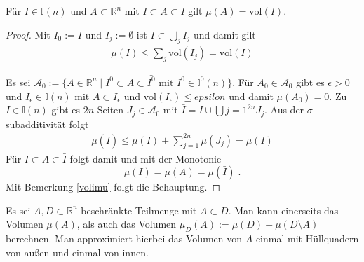 \begin{Satz}
Für $I \in \mathbb{I}(n)$  und $A \subset \mathbb{R}^n$ mit $I \subset A \subset \bar{I}$ gilt $\mu (A) = \text{vol}(I)$.
\end{Satz}
\begin{proof}
Mit $I_0:=  I$ und $I_j := \emptyset$ ist $I \subset \bigcup_j I_j$ und damit gilt 
\begin{align*}
\mu(I) \leq \sum_j \text{vol}(I_j) = \text{vol}(I)
\end{align*}

Es sei $\mathcal{A}_0 := \{ A  \in \mathbb{R}^n  \; | \;  I^0 \subset A \subset \bar{I^0}  \text{  mit } I^0 \in \mathbb{I}^0(n) \}$. Für $A_0 \in \mathcal{A}_0$ gibt es 
$\epsilon > 0$ und $I_{\epsilon} \in \mathbb{I}(n)$ mit $A \subset I_{\epsilon}$ und $\text{vol} (I_{\epsilon})  \leq epsilon$ und damit $\mu(A_0) = 0$.
Zu $I \in \mathbb{I}(n)$ gibt es $2n$-Seiten $J_j \in \mathcal{A}_0$ mit 
$\bar{I} = I \cup \bigcup{j= 1}^{2n} J_j$. Aus der $\sigma$-subadditivität folgt
\begin{align*}
\mu(\bar{I})  \leq \mu(I) + \sum_{j=1}^{2n} \mu(J_j) = \mu (I)
\end{align*}
 Für $I \subset A \subset \bar{I}$ folgt damit und mit der Monotonie
$$ \mu(I) = \mu(A) = \mu(\bar{I}) \;. $$
Mit Bemerkung \ref{volimu} folgt die Behauptung.

\end{proof}


Es sei $A, D \subset \mathbb{R}^n$  beschränkte Teilmenge mit $A \subset D$.  
Man kann einerseits das Volumen $\mu(A)$, als auch das Volumen 
$\mu_D(A) :=  \mu(D) - \mu(D  \setminus  A)$ berechnen. Man approximiert hierbei das Volumen von $A$ einmal mit Hüllquadern von außen und einmal von innen.
 
